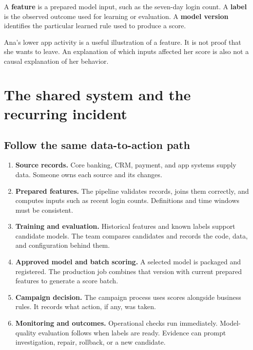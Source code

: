 \documentclass[12pt,a4paper]{article}
\begin{document}
A \textbf{feature} is a prepared model input, such as the seven-day login count. A \textbf{label} is the observed outcome used for learning or evaluation. A \textbf{model version} identifies the particular learned rule used to produce a score.

Ana's lower app activity is a useful illustration of a feature. It is not proof that she wants to leave. An explanation of which inputs affected her score is also not a causal explanation of her behavior.

\section{The shared system and the recurring incident}
\subsection{Follow the same data-to-action path}
\begin{enumerate}
\item \textbf{Source records.} Core banking, CRM, payment, and app systems supply data. Someone owns each source and its changes.
\item \textbf{Prepared features.} The pipeline validates records, joins them correctly, and computes inputs such as recent login counts. Definitions and time windows must be consistent.
\item \textbf{Training and evaluation.} Historical features and known labels support candidate models. The team compares candidates and records the code, data, and configuration behind them.
\item \textbf{Approved model and batch scoring.} A selected model is packaged and registered. The production job combines that version with current prepared features to generate a score batch.
\item \textbf{Campaign decision.} The campaign process uses scores alongside business rules. It records what action, if any, was taken.
\item \textbf{Monitoring and outcomes.} Operational checks run immediately. Model-quality evaluation follows when labels are ready. Evidence can prompt investigation, repair, rollback, or a new candidate.
\end{enumerate}
\end{document}
